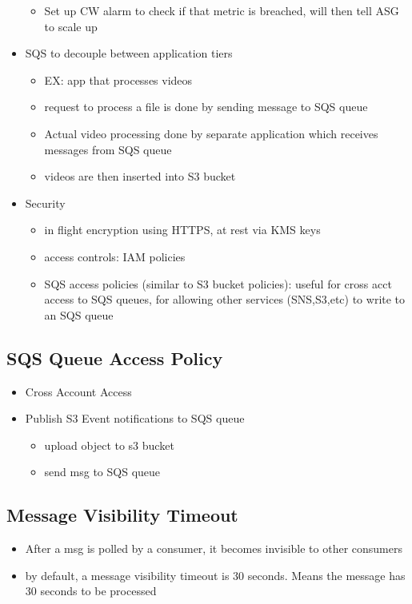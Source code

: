 \documentclass[]{scrartcl}
\begin{document}
\begin{itemize}
\begin{itemize}
		\item Set up CW alarm to check if that metric is breached, will then tell ASG to scale up
	\end{itemize}
	\item SQS to decouple between application tiers
	\begin{itemize}
		\item EX: app that processes videos
		\item request to process a file is done by sending message to SQS queue
		\item Actual video processing done by separate application which receives messages from SQS queue
		\item videos are then inserted into S3 bucket
	\end{itemize}
	\item Security
	\begin{itemize}
		\item in flight encryption using HTTPS, at rest via KMS keys
		\item access controls: IAM policies
		\item SQS access policies (similar to S3 bucket policies): useful for cross acct access to SQS queues, for allowing other services (SNS,S3,etc) to write to an SQS queue
	\end{itemize}
\end{itemize}

\subsection{SQS Queue Access Policy}
\begin{itemize}
	\item Cross Account Access
	\item Publish S3 Event notifications to SQS queue
	\begin{itemize}
		\item upload object to s3 bucket
		\item send msg to SQS queue
	\end{itemize}
\end{itemize}

\subsection{Message Visibility Timeout}
\begin{itemize}
	\item After a msg is polled by a consumer, it becomes invisible to other consumers
	\item by default, a message visibility timeout is 30 seconds. Means the message has 30 seconds to be processed
\end{itemize}
\end{document}
